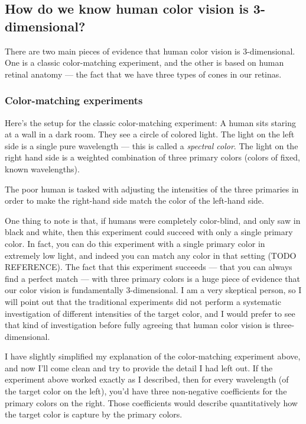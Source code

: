 \documentclass[
]{article}
\begin{document}
\hypertarget{how-do-we-know-human-color-vision-is-3-dimensional}{%
\subsection{How do we know human color vision is
3-dimensional?}\label{how-do-we-know-human-color-vision-is-3-dimensional}}

There are two main pieces of evidence that human color vision is
3-dimensional. One is a classic color-matching experiment, and the other
is based on human retinal anatomy --- the fact that we have three types
of cones in our retinas.

\hypertarget{color-matching-experiments}{%
\subsubsection{Color-matching
experiments}\label{color-matching-experiments}}

Here's the setup for the classic color-matching experiment: A human sits
staring at a wall in a dark room. They see a circle of colored light.
The light on the left side is a single pure wavelength --- this is
called a \emph{spectral color}. The light on the right hand side is a
weighted combination of three primary colors (colors of fixed, known
wavelengths).

The poor human is tasked with adjusting the intensities of the three
primaries in order to make the right-hand side match the color of the
left-hand side.

One thing to note is that, if humans were completely color-blind, and
only saw in black and white, then this experiment could succeed with
only a single primary color. In fact, you can do this experiment with a
single primary color in extremely low light, and indeed you can match
any color in that setting (TODO REFERENCE). The fact that this
experiment succeeds --- that you can always find a perfect match ---
with three primary colors is a huge piece of evidence that our color
vision is fundamentally 3-dimensional. I am a very skeptical person, so
I will point out that the traditional experiments did not perform a
systematic investigation of different intensities of the target color,
and I would prefer to see that kind of investigation before fully
agreeing that human color vision is three-dimensional.

I have slightly simplified my explanation of the color-matching
experiment above, and now I'll come clean and try to provide the detail
I had left out. If the experiment above worked exactly as I described,
then for every wavelength (of the target color on the left), you'd have
three non-negative coefficients for the primary colors on the right.
Those coefficients would describe quantitatively how the target color is
capture by the primary colors.
\end{document}
